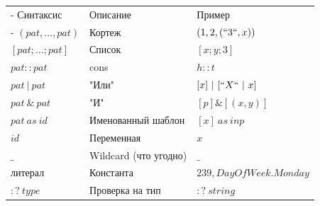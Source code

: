 \documentclass[a5paper]{article}
\begin{document}
\begin{tabu} {| X[0.9 l p] | X[1 l p] | X[1 l p] |}
	\tabucline-
	Синтаксис                               & Описание                  & Пример                  \\
	\tabucline-
	\everyrow{\tabucline-}
	$(pat, \ldots, pat)$                    & Кортеж                    & $(1, 2, (``3``, x))$    \\
	$[pat; \ldots; pat]$                    & Список                    & $[x; y; 3]$             \\
	$pat :: pat$                            & cons                      & $h :: t$                \\
	$pat\ |\ pat$                           & "Или"                     & $[x]\ |\ [``X``\ |\ x]$ \\
	$pat\ \&\ pat$                          & "И"                       & $[p] \& [(x, y)]$       \\
	$pat\ as\ id$                           & Именованный шаблон        & $[x]\ as\ inp$          \\
	$id$                                    & Переменная                & $x$                     \\
	$\_$                                    & Wildcard (что угодно)     & $\_$                    \\
	литерал                                 & Константа                 & $239, DayOfWeek.Monday$ \\
	$:?\ type$                              & Проверка на тип           & $:?\ string$            \\
\end{tabu}
\end{document}
